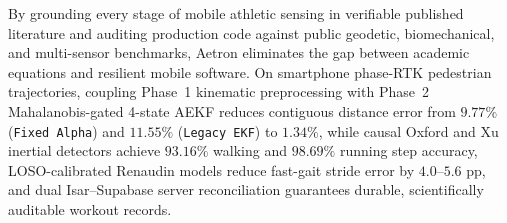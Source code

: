 \documentclass[journal]{IEEEtran}
\begin{document}
By grounding every stage of mobile athletic sensing in verifiable published literature and auditing production code against public geodetic, biomechanical, and multi-sensor benchmarks, Aetron eliminates the gap between academic equations and resilient mobile software. On smartphone phase-RTK pedestrian trajectories, coupling Phase~1 kinematic preprocessing with Phase~2 Mahalanobis-gated 4-state AEKF reduces contiguous distance error from $9.77\%$ (\texttt{Fixed Alpha}) and $11.55\%$ (\texttt{Legacy EKF}) to $1.34\%$, while causal Oxford and Xu inertial detectors achieve $93.16\%$ walking and $98.69\%$ running step accuracy, LOSO-calibrated Renaudin models reduce fast-gait stride error by $4.0\text{--}5.6\text{ pp}$, and dual Isar--Supabase server reconciliation guarantees durable, scientifically auditable workout records.



\end{document}
